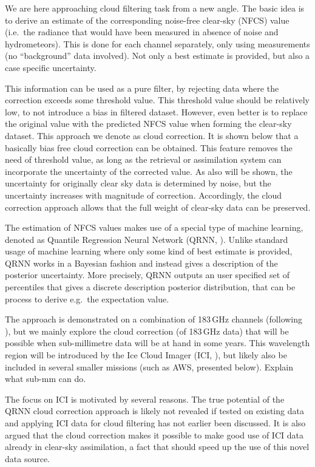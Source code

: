 \documentclass[amt, manuscript]{copernicus}
\newcommand{\todo}[1]{{\color{red} #1}}
\begin{document}
We are here approaching cloud filtering task from a new angle. The basic idea
is to derive an estimate of the corresponding noise-free clear-sky (NFCS) value
(i.e.\ the radiance that would have been measured in absence of noise and
hydrometeors). This is done for each channel separately, only using
measurements (no ``background'' data involved). Not only a best estimate is
provided, but also a case specific uncertainty.

This information can be used as a pure filter, by rejecting data where the
correction exceeds some threshold value. This threshold value should be
relatively low, to not introduce a bias in filtered dataset. However, even
better is to replace the original value with the predicted NFCS value when
forming the clear-sky dataset. This approach we denote as cloud correction. It
is shown below that a basically bias free cloud correction can be obtained.
This feature removes the need of threshold value, as long as the retrieval or
assimilation system can incorporate the uncertainty of the corrected value. As
also will be shown, the uncertainty for originally clear sky data is determined
by noise, but the uncertainty increases with magnitude of correction.
Accordingly, the cloud correction approach allows that the full weight of
clear-sky data can be preserved.

The estimation of NFCS values makes use of a special type of machine learning,
denoted as Quantile Regression Neural Network (QRNN,
\citet{pfreundschuh:aneur:18}). Unlike standard usage of machine learning where
only some kind of best estimate is provided, QRNN works in a Bayesian fashion
and instead gives a description of the posterior uncertainty. More precisely,
QRNN outputs an user specified set of percentiles that gives a discrete
description posterior distribution, that can be process to derive e.g.\ the
expectation value.

The approach is demonstrated on a combination of 183\,GHz channels (following
\citet{buehler:aclou:07}), but we mainly explore the cloud correction (of
183\,GHz data) that will be possible when sub-millimetre data will be at hand
in some years. This wavelength region will be introduced by the Ice Cloud
Imager (ICI, \citet{eriksson:towar:20}), but likely also be included in several
smaller missions (such as AWS, presented below). \todo{Explain what sub-mm can
  do}.

The focus on ICI is motivated by several reasons. The true potential of the
QRNN cloud correction approach is likely not revealed if tested on existing
data and applying ICI data for cloud filtering has not earlier been discussed.
It is also argued that the cloud correction makes it possible to make good use
of ICI data already in clear-sky assimilation, a fact that should speed up the
use of this novel data source.
\end{document}
